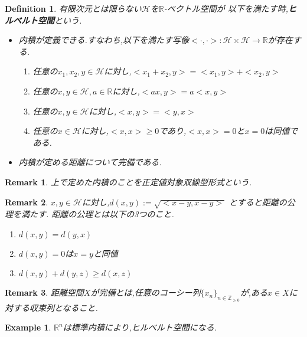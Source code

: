 \documentclass{ujarticle}
\newtheorem{dfn}[thm]{Definition}
\newtheorem{epl}[thm]{Example}
\newtheorem*{rem}{Remark}
\begin{document}
\begin{dfn}
  有限次元とは限らない$\mathcal{H}$を$\mathbb{R}$-ベクトル空間が
  以下を満たす時,\textbf{ヒルベルト空間}という.
  \begin{itemize}
    \item 内積が定義できる.すなわち,以下を満たす写像$< \cdot , \cdot >: \mathcal{H} \times \mathcal{H} \to \mathbb{R}$が存在する.
      \begin{enumerate}
        \item 任意の$x_1,x_2,y \in \mathcal{H}$に対し,${<}x_1 +x_2,y{>}= {<}x_1,y{>} +{<}x_2,y{>}$
        \item 任意の$x,y \in \mathcal{H},a \in \mathbb{R}$に対し,$<ax,y> =a<x,y>$
        \item 任意の$x,y \in \mathcal{H}$に対し,$<x,y>=<y,x>$
        \item 任意の$x \in \mathcal{H}$に対し,${<}x,x{>} \ge 0$であり,${<}x,x{>}=0$と$x=0$は同値である.
      \end{enumerate}
    \item 内積が定める距離について完備である.
  \end{itemize}
\end{dfn}
\begin{rem}
上で定めた内積のことを正定値対象双線型形式という.
\end{rem}
\begin{rem}
  $x,y \in \mathcal{H}$に対し,$d(x,y):=\sqrt{{<}x-y,x-y{>}}$
 とすると距離の公理を満たす.
 距離の公理とは以下の3つのこと.
 \begin{enumerate}
   \item $d(x,y)=d(y,x)$
   \item $d(x,y)=0$は$x=y$と同値
   \item $d(x,y)+d(y,z) \ge d(x,z)$
 \end{enumerate}
\end{rem}
\begin{rem}
 距離空間$X$が完備とは,任意のコーシー列$\{x_n\}_{n \in \mathbb{Z}_{\ge 0}}$が,ある$x \in X$に対する収束列となること.
\end{rem}
\begin{epl}
 $\mathbb{R}^n$は標準内積により,ヒルベルト空間になる.
\end{epl}
\end{document}
